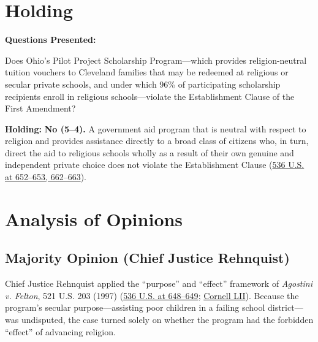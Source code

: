 \documentclass[12pt]{article}
\begin{document}
\section{Holding}
\textbf{Questions Presented:}

Does Ohio's Pilot Project Scholarship Program---which provides religion-neutral tuition vouchers to Cleveland families that may be redeemed at religious or secular private schools, and under which 96\% of participating scholarship recipients enroll in religious schools---violate the Establishment Clause of the First Amendment?

\textbf{Holding:} \textbf{No (5--4).} A government aid program that is neutral with respect to religion and provides assistance directly to a broad class of citizens who, in turn, direct the aid to religious schools wholly as a result of their own genuine and independent private choice does not violate the Establishment Clause (\href{https://supreme.justia.com/cases/federal/us/536/639/}{536 U.S. at 652--653, 662--663}).

\section{Analysis of Opinions}
\subsection{Majority Opinion (Chief Justice Rehnquist)}

Chief Justice Rehnquist applied the ``purpose'' and ``effect'' framework of \emph{Agostini v. Felton}, 521 U.S. 203 (1997) (\href{https://supreme.justia.com/cases/federal/us/536/639/}{536 U.S. at 648--649}; \href{https://www.law.cornell.edu/constitution-conan/amendment-1/zelman-and-indirect-aid}{Cornell LII}). Because the program's secular purpose---assisting poor children in a failing school district---was undisputed, the case turned solely on whether the program had the forbidden ``effect'' of advancing religion.
\end{document}
